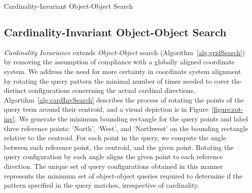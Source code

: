 {\begin{algorithm}[h]
    \caption{Cardinality-Invariant Object-Object Search}\label{alg:cardInvSearch}
    \begin{algorithmic}
        \State{- - - - -}
             
                    \EndIf
                \EndFor
            \EndFor
        \EndProcedure
    \end{algorithmic}
\end{algorithm}


\subsection{Cardinality-Invariant Object-Object Search}
\textit{Cardinality Invariance} extends \textit{Object-Object} search (Algorithm~\ref{alg:gridSearch}) by removing the assumption of compliance with a globally aligned coordinate system.
%
We address the need for more certainty in coordinate system alignment by rotating the query pattern the minimal number of times needed to cover the distinct configurations concerning the actual cardinal directions.
%
Algortihm~\ref{alg:cardInvSearch} describes the process of rotating the points of the query term around their centroid, and a visual depiction is in Figure~\ref{figure:rot-inv}.
We generate the minimum bounding rectangle for the query points and label three reference points: `North', `West', and `Northwest' on the bounding rectangle relative to the centroid. 
For each point in the query, we compute the angle between each reference point, the centroid, and the given point. 
Rotating the query configuration by each angle aligns the given point to each reference direction.
The unique set of query configurations obtained in this manner represents the minimum set of object-object queries required to determine if the pattern specified in the query matches, irrespective of cardinality. 

}
